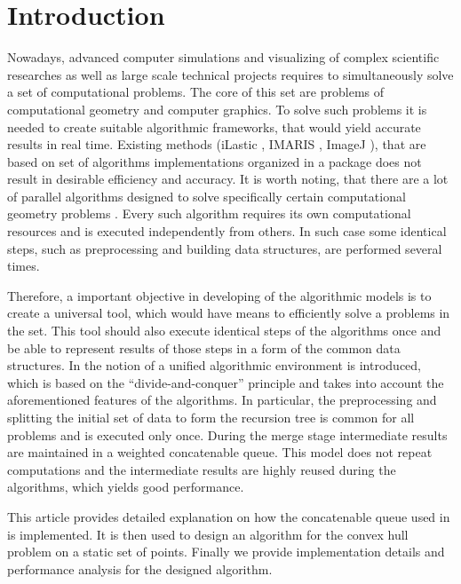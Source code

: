 \documentclass[conference]{IEEEtran}
\theoremstyle{plane}
\begin{document}
\section{Introduction}
		
		Nowadays, advanced computer simulations and visualizing of complex scientific researches as well as large scale technical projects requires to simultaneously solve a set of computational problems. The core of this set are problems of computational geometry and computer graphics. To solve such problems it is needed to create suitable algorithmic frameworks, that would yield accurate results in real time. Existing methods (iLastic \cite{ilastik}, IMARIS \cite{imaris}, ImageJ \cite{imagej}), that are based on set of algorithms implementations organized in a package does not result in desirable efficiency and accuracy. It is worth noting, that there are a lot of parallel algorithms designed to solve specifically certain computational geometry problems \cite{aggarwal,atallah,cole,amato,chen,berkman,goodman,akl,jaja,leeuwen,reif}. Every such algorithm requires its own computational resources and is executed independently from others. In such case some identical steps, such as preprocessing and building data structures, are performed several times. 
		
		Therefore, a important objective in developing of the algorithmic models is to create a universal tool, which would have means to efficiently solve a problems in the set. This tool should also execute identical steps of the algorithms once and be able to represent results of those steps in a form of the common data structures. In \cite{tereshchenko} the notion of a unified algorithmic environment is introduced, which is based on the ``divide-and-conquer'' principle and takes into account the aforementioned features of the algorithms. In particular, the preprocessing and splitting the initial set of data to form the recursion tree is common for all problems and is executed only once. During the merge stage intermediate results are maintained in a weighted concatenable queue. This model does not repeat computations and the intermediate results are highly reused during the algorithms, which yields good performance.
		
		This article provides detailed explanation on how the concatenable queue used in \cite{tereshchenko} is implemented. It is then used to design an algorithm for the convex hull problem on a static set of points. Finally we provide implementation details and performance analysis for the designed algorithm.
\end{document}
